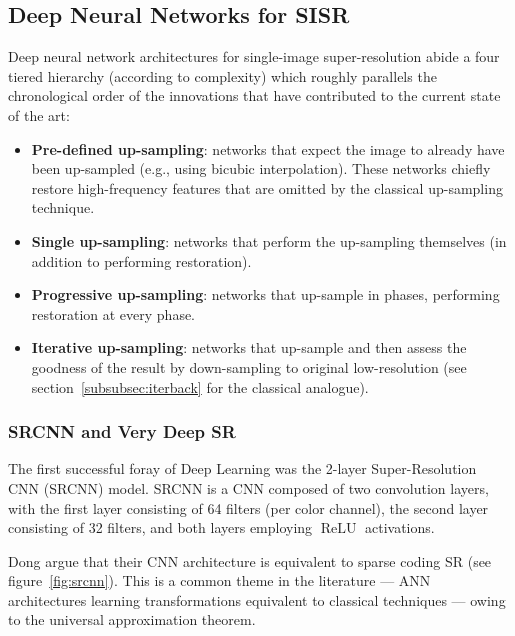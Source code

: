 \subsection{Deep Neural Networks for SISR}
Deep neural network architectures for single-image super-resolution abide a four tiered hierarchy (according to complexity) which roughly parallels the chronological order of the innovations that have contributed to the current state of the art:
\begin{framed}
    \begin{itemize}
        \item \textbf{Pre-defined up-sampling}: networks that expect the image to already have been up-sampled (e.g., using bicubic interpolation). These networks chiefly restore high-frequency features that are omitted by the classical up-sampling technique.
        \item \textbf{Single up-sampling}: networks that perform the up-sampling themselves (in addition to performing restoration).
        \item \textbf{Progressive up-sampling}: networks that up-sample in phases, performing restoration at every phase.
        \item \textbf{Iterative up-sampling}: networks that up-sample and then assess the goodness of the result by down-sampling to original low-resolution (see section~\ref{subsubsec:iterback} for the classical analogue).
    \end{itemize}
\end{framed}
\subsubsection{SRCNN and Very Deep SR}\label{subsubsec:vdsr}
The first successful foray of Deep Learning was the 2-layer Super-Resolution CNN (SRCNN) model\cite{Dong_2016}.
%
SRCNN is a CNN composed of two convolution layers, with the first layer consisting of 64 filters (per color channel), the second layer consisting of 32 filters, and both layers employing \(\operatorname{ReLU}\) activations.
%

Dong \etal argue that their CNN architecture is equivalent to sparse coding SR (see figure~\ref{fig:srcnn}).
%
This is a common theme in the literature --- ANN architectures learning transformations equivalent to classical techniques --- owing to the universal approximation theorem.

